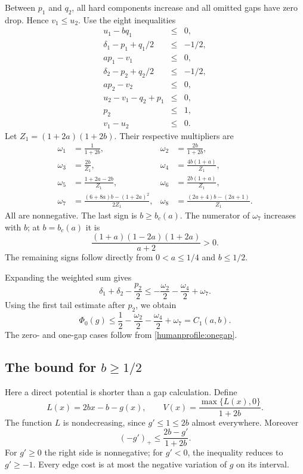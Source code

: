 Between \(p_1\) and \(q_2\), all hard components increase and
all omitted gaps have zero drop. Hence \(v_1\le u_2\).
Use the eight inequalities
\[
 \begin{array}{rcl}
 u_1-bq_1&\le&0,\\
 \delta_1-p_1+q_1/2&\le&-1/2,\\
 ap_1-v_1&\le&0,\\
 \delta_2-p_2+q_2/2&\le&-1/2,\\
 ap_2-v_2&\le&0,\\
 u_2-v_1-q_2+p_1&\le&0,\\
 p_2&\le&1,\\
 v_1-u_2&\le&0 .
 \end{array}
\]
Let \(Z_1=(1+2a)(1+2b)\). Their respective multipliers are
\[
 \begin{aligned}
 \omega_1&=\frac1{1+2b},&
 \omega_2&=\frac{2b}{1+2b},\\
 \omega_3&=\frac{2b}{Z_1},&
 \omega_4&=\frac{4b(1+a)}{Z_1},\\
 \omega_5&=\frac{1+2a-2b}{Z_1},&
 \omega_6&=\frac{2b(1+a)}{Z_1},\\
 \omega_7&=\frac{(6+8a)b-(1+2a)^2}{2Z_1},&
 \omega_8&=\frac{(2a+4)b-(2a+1)}{Z_1}.
 \end{aligned}
\]
All are nonnegative. The last sign is \(b\ge b_c(a)\).
The numerator of \(\omega_7\) increases with \(b\); at \(b=b_c(a)\)
it is
\[
 \frac{(1+a)(1-2a)(1+2a)}{a+2}>0.
\]
The remaining signs follow directly from \(0<a\le1/4\) and
\(b\le1/2\).

Expanding the weighted sum gives
\[
 \delta_1+\delta_2-\frac{p_2}{2}
 \le-\frac{\omega_2}{2}-\frac{\omega_4}{2}+\omega_7.
\]
Using the first tail estimate after \(p_2\), we obtain
\[
 \Phi_0(g)
 \le\frac12-\frac{\omega_2}{2}-\frac{\omega_4}{2}+\omega_7
 =C_1(a,b).
\]
The zero- and one-gap cases follow from \eqref{humanprofile:onegap}.

\subsection{The bound for \(b\ge1/2\)}

Here a direct potential is shorter than a gap calculation. Define
\[
 L(x)=2bx-b-g(x),\qquad
 V(x)=\frac{\max\{L(x),0\}}{1+2b}.
\]
The function \(L\) is nondecreasing, since \(g'\le1\le2b\)
almost everywhere. Moreover
\[
 (-g')_+\le\frac{2b-g'}{1+2b}.
\]
For \(g'\ge0\) the right side is nonnegative; for \(g'<0\),
the inequality reduces to \(g'\ge-1\).
Every edge cost is at most the negative variation of \(g\) on its
interval.

